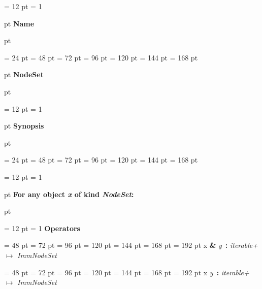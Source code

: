 {\par \noindent
{\par \pagebreak[3.300000] \noindent \hangindent = 12 pt \hangafter = 1 
{\par \pagebreak[3]  pt \noindent
{\Large {\bf Name\/}}\par {} pt
} \noindent
\par}
{\par \noindent  \leftskip = 24 pt  \leftmargini = 48 pt  \leftmarginii = 72 pt  \leftmarginiii = 96 pt  \leftmarginiv = 120 pt  \leftmarginv = 144 pt  \leftmarginvi = 168 pt {\par \pagebreak[3]  pt \noindent
{\Large {\bf NodeSet\/}}\par {} pt
} \noindent
\par}
{\par \pagebreak[3.300000] \noindent \hangindent = 12 pt \hangafter = 1 
{\par \pagebreak[3]  pt \noindent
{\Large {\bf Synopsis\/}}\par {} pt
} \noindent
\par}
{\par \noindent  \leftskip = 24 pt  \leftmargini = 48 pt  \leftmarginii = 72 pt  \leftmarginiii = 96 pt  \leftmarginiv = 120 pt  \leftmarginv = 144 pt  \leftmarginvi = 168 pt {\par \noindent
{\par \pagebreak[3.200000] \noindent \hangindent = 12 pt \hangafter = 1 
{\par \pagebreak[2]  pt \noindent
{\large {\bf For any object {\em x\/} of kind  {\em NodeSet\/}:\/}}\par {} pt
} \noindent
\par}
{\par \pagebreak[3.200000] \noindent \hangindent = 12 pt \hangafter = 1 
{\bf {\large {\bf Operators\/}}\/}\par}
{\par \noindent  \leftskip = 48 pt  \leftmargini = 72 pt  \leftmarginii = 96 pt  \leftmarginiii = 120 pt  \leftmarginiv = 144 pt  \leftmarginv = 168 pt  \leftmarginvi = 192 pt x {\large {\bf {\&}\/}} {\em y\/}~{\bf :}  {\em iterable+\/} \(\mapsto \)  {\em ImmNodeSet\/}\par}
{\par \noindent  \leftskip = 48 pt  \leftmargini = 72 pt  \leftmarginii = 96 pt  \leftmarginiii = 120 pt  \leftmarginiv = 144 pt  \leftmarginv = 168 pt  \leftmarginvi = 192 pt x {\large {\bf {\textbar}\/}} {\em y\/}~{\bf :}  {\em iterable+\/} \(\mapsto \)  {\em ImmNodeSet\/}\par}
}}}
